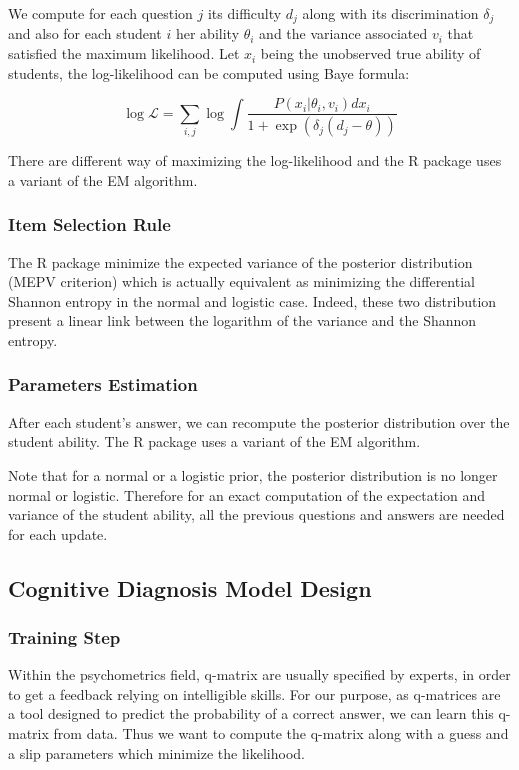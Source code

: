 \documentclass{sig-alternate}
\begin{document}
We compute for each question $j$ its difficulty $d_j$ along with its discrimination $\delta_j$ and also for each student $i$ her ability $\theta_i$ and the variance associated $v_i$ that satisfied the maximum likelihood. Let $x_i$ being the unobserved true ability of students, the log-likelihood can be computed using Baye formula: 

\[\log \mathcal{L} = \sum_{i,j} \log \int \frac{P(x_i | \theta_i, v_i)dx_i}{1+\exp(\delta_j (d_j - \theta))}\]

There are different way of maximizing the log-likelihood and the R package uses a variant of the EM algorithm. 

\subsubsection{Item Selection Rule}

The R package minimize the expected variance of the posterior distribution (MEPV criterion) which is actually equivalent as minimizing the differential Shannon entropy in the normal and logistic case. Indeed, these two distribution present a linear link between the logarithm of the variance and the Shannon entropy.  %

\subsubsection{Parameters Estimation}

After each student's answer, we can recompute the posterior distribution over the student ability. The R package uses a variant of the EM algorithm. 

Note that for a normal or a logistic prior, the posterior distribution is no longer normal or logistic. Therefore for an exact computation of the expectation and variance of the student ability, all the previous questions and answers are needed for each update. 

\subsection{Cognitive Diagnosis Model Design}

\subsubsection{Training Step}

Within the psychometrics field, q-matrix are usually specified by experts, in order to get a feedback relying on intelligible skills. For our purpose, as q-matrices are a tool designed to predict the probability of a correct answer, we can learn this q-matrix from data. Thus we want to compute the q-matrix along with a guess and a slip parameters which minimize the likelihood.
\end{document}
